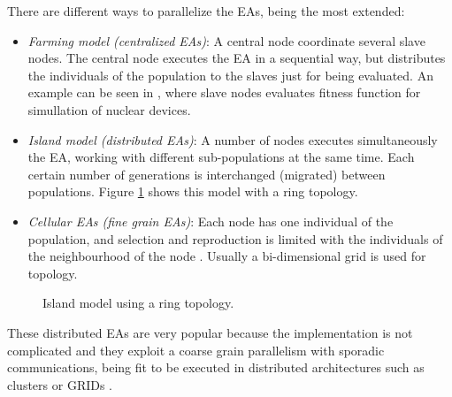 \documentclass[final,1p,times]{elsarticle}
\begin{document}
There are different ways to parallelize the EAs, being the most extended:
\begin{itemize}
\item {\em Farming model (centralized EAs)}: A central node coordinate several slave nodes. The central node executes the EA in a sequential way, but distributes the individuals of the population to the slaves just for being evaluated. An example can be seen in \cite{NUCLEAR}, where slave nodes evaluates fitness function for simullation of nuclear devices.
\item {\em Island model (distributed EAs)}: A number of nodes executes simultaneously the EA, working with different sub-populations at the same time. Each certain number of generations is interchanged (migrated) between populations. Figure \ref{fig:islands} shows this model with a ring topology.
\item {\em Cellular EAs (fine grain EAs)}: Each node has one individual of the population, and selection and reproduction is limited with the individuals of the neighbourhood of the node \cite{CELLULAR}. Usually a bi-dimensional grid is used for topology. 
\end{itemize}

\begin{figure}[htb]
\centering
{}
\caption{Island model using a ring topology.}
\label{fig:islands}
\end{figure}


These distributed EAs are very popular because the implementation is
not complicated  %
 and they exploit a coarse grain parallelism with sporadic %
 communications, being fit to be executed in distributed architectures
 such as clusters or GRIDs \cite{PLATO}. %
\end{document}
